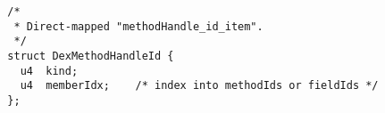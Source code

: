 {\scriptsize \begin{verbatim}
  /*
   * Direct-mapped "methodHandle_id_item".
   */
  struct DexMethodHandleId {
    u4  kind;
    u4  memberIdx;    /* index into methodIds or fieldIds */
  };
\end{verbatim} }
